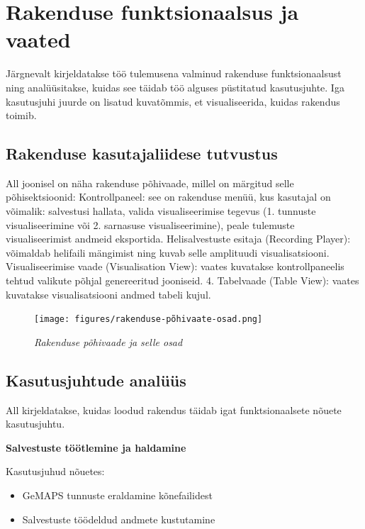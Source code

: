 \section{Rakenduse funktsionaalsus ja vaated}
Järgnevalt kirjeldatakse töö tulemusena valminud rakenduse funktsionaalsust ning analüüsitakse, kuidas see täidab töö alguses püstitatud kasutusjuhte. Iga kasutusjuhi juurde on lisatud kuvatõmmis, et visualiseerida, kuidas rakendus toimib.

\subsection{Rakenduse kasutajaliidese tutvustus}
All joonisel on näha rakenduse põhivaade, millel on märgitud selle põhisektsioonid:
Kontrollpaneel: see on rakenduse menüü, kus kasutajal on võimalik: salvestusi hallata, valida visualiseerimise tegevus (1. tunnuste visualiseerimine või 2. sarnasuse visualiseerimine), peale tulemuste visualiseerimist andmeid eksportida.
Helisalvestuste esitaja (Recording Player): võimaldab helifaili mängimist ning kuvab selle amplituudi visualisatsiooni.
Visualiseerimise vaade (Visualisation View): vaates kuvatakse kontrollpaneelis tehtud valikute põhjal genereeritud jooniseid.
4.	Tabelvaade (Table View): vaates kuvatakse visualisatsiooni andmed tabeli kujul.

\begin{figure}[H]
    \centering
    \texttt{[image: figures/rakenduse-põhivaate-osad.png]}
    \caption{\textit{Rakenduse põhivaade ja selle osad}}
    \label{fig:rakenduse-põhivaate-osad}
\end{figure}

\subsection{Kasutusjuhtude analüüs}
All kirjeldatakse, kuidas loodud rakendus täidab igat funktsionaalsete nõuete kasutusjuhtu.

\textbf{Salvestuste töötlemine ja haldamine
}

Kasutusjuhud nõuetes:
\begin{itemize}
    \item GeMAPS tunnuste eraldamine kõnefailidest
    \item Salvestuste töödeldud andmete kustutamine
\end{itemize}

